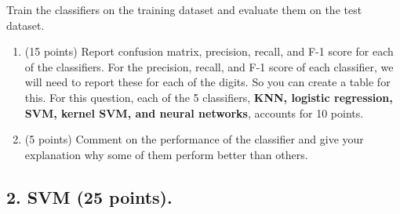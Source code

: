 \documentclass[12pt]{article}
\begin{document}
Train the classifiers on the training dataset and evaluate them on the test dataset.

\begin{enumerate}

	\item (15 points) Report confusion matrix, precision, recall, and F-1 score for each of the classifiers. For the precision, recall, and F-1 score of each classifier, we will need to report these for each of the digits. So you can create a table for this. For this question, each of the 5 classifiers, {\bf KNN, logistic regression, SVM, kernel SVM, and neural networks}, accounts for 10 points.
	\item (5 points) Comment on the performance of the classifier and give your explanation why some of them perform better than others.	
\end{enumerate}


\subsection*{2. SVM (25 points).}
\end{document}
